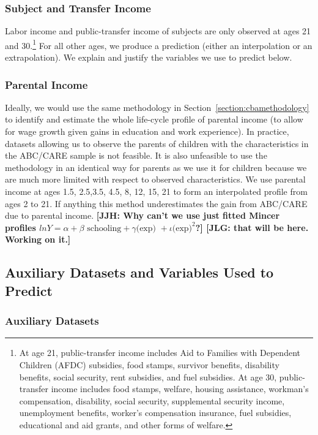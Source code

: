 \subsubsection{Subject and Transfer Income}

\noindent Labor income and public-transfer income of subjects are only observed at ages 21 and 30.\footnote{At age 21, public-transfer income includes Aid to Families with Dependent Children (AFDC) subsidies, food stamps, survivor benefits, disability benefits, social security, rent subsidies, and fuel subsidies. At age 30, public-transfer income includes food stamps, welfare, housing assistance, workman's compensation, disability, social security, supplemental security income, unemployment benefits, worker's compensation insurance, fuel subsidies, educational and aid grants, and other forms of welfare.} For all other ages, we produce a prediction (either an interpolation or an extrapolation). We explain and justify the variables we use to predict below.

\subsubsection{Parental Income}

\noindent Ideally, we would use the same methodology in Section~\ref{section:cbamethodology} to identify and estimate the whole life-cycle profile of parental income (to allow for wage growth given gains in education and work experience). In practice, datasets allowing us to observe the parents of children with the characteristics in the ABC/CARE sample is not feasible. It is also unfeasible to use the methodology in an identical way for parents as we use it for children because we are much more limited with respect to observed characteristics. We use parental income at ages 1.5, 2.5,3.5, 4.5, 8, 12, 15, 21 to form an interpolated profile from ages 2 to 21. If anything this method underestimates the gain from ABC/CARE due to parental income. \textbf{[JJH: Why can't we use just fitted Mincer profiles $ln Y=\alpha + \beta \text{ schooling} + \gamma \text{(exp) } + \iota {\text{(exp)}}^{2}$?] [JLG: that will be here. Working on it.]}

\subsection{Auxiliary Datasets and Variables Used to Predict}

\subsubsection{Auxiliary Datasets}

